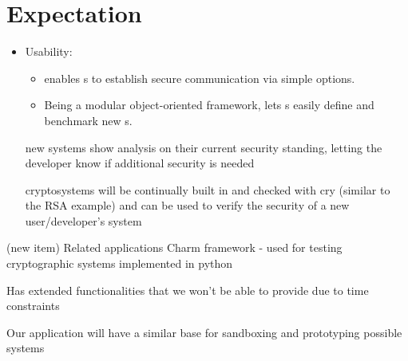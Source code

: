 \section{Expectation}

\begin{itemize}
\item Usability:
  \begin{itemize}
  \item \cry{} enables \eu s to establish
    secure communication via simple \cl{} options.
  \item Being a modular object-oriented framework,
    \cry{} lets \cg s easily define and benchmark new \cs s.
  \end{itemize}
  new systems show analysis on their current security standing, letting the developer know if additional security is needed
  
  cryptosystems will be continually built in and checked with cry (similar to the RSA example) and can be used to verify the security of
  a new user/developer's system
\end{itemize}
(new item) Related applications
  Charm framework - used for testing cryptographic systems implemented in python 
  
  Has extended functionalities that we won't be able to provide due to time constraints
  
  Our application will have a similar base for sandboxing and prototyping possible systems
